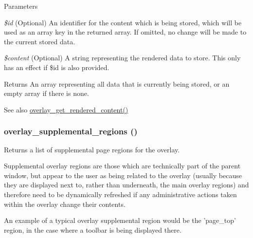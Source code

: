 \begin{DoxyParams}{Parameters}
\item[{\em \$id}](Optional) An identifier for the content which is being stored, which will be used as an array key in the returned array. If omitted, no change will be made to the current stored data. \item[{\em \$content}](Optional) A string representing the rendered data to store. This only has an effect if \$id is also provided.\end{DoxyParams}
\begin{DoxyReturn}{Returns}
An array representing all data that is currently being stored, or an empty array if there is none.
\end{DoxyReturn}
\begin{DoxySeeAlso}{See also}
\hyperlink{overlay_8module_a3dc272e9d1defe33078ae1c168acad24}{overlay\_\-get\_\-rendered\_\-content()} 
\end{DoxySeeAlso}
\hypertarget{overlay_8module_a450e5cee4c93de608b64aa7b3fc8cfe4}{
\subsubsection[{overlay\_\-supplemental\_\-regions}]{\setlength{\rightskip}{0pt plus 5cm}overlay\_\-supplemental\_\-regions ()}}
\label{overlay_8module_a450e5cee4c93de608b64aa7b3fc8cfe4}
Returns a list of supplemental page regions for the overlay.

Supplemental overlay regions are those which are technically part of the parent window, but appear to the user as being related to the overlay (usually because they are displayed next to, rather than underneath, the main overlay regions) and therefore need to be dynamically refreshed if any administrative actions taken within the overlay change their contents.

An example of a typical overlay supplemental region would be the 'page\_\-top' region, in the case where a toolbar is being displayed there.

